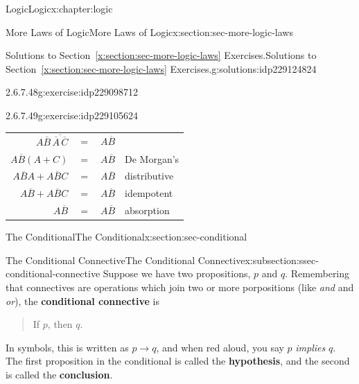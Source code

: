 \documentclass[twoside,10pt,]{book}
\newcommand{\tabularfont}{\relax}
\newcommand{\xreffont}{\relax}
\newcommand{\terminology}[1]{\textbf{#1}}
\numberwithin{equation}{section}
\newcommand{\conditional}{{p {\rightarrow} q}}
\begin{document}
\begin{chapterptx}{Logic}{}{Logic}{}{}{x:chapter:logic}
\begin{sectionptx}{More Laws of Logic}{}{More Laws of Logic}{}{}{x:section:sec-more-logic-laws}
\begin{solutions-subsection}{Solutions to Section~{\xreffont\ref*{x:section:sec-more-logic-laws}} Exercises.}{}{Solutions to Section~{\xreffont\ref*{x:section:sec-more-logic-laws}} Exercises.}{}{}{g:solutions:idp229124824}
\begin{exercisegroup}
\begin{divisionsolutioneg}{2.6.7.48}{}{g:exercise:idp229098712}
\begin{center}
{}%
\end{center}%
\end{divisionsolutioneg}%
\begin{divisionsolutioneg}{2.6.7.49}{}{g:exercise:idp229105624}%
\par\smallskip%
\noindent\hypertarget{g:solution:idp229107928-main}{}\begin{center}%
{\tabularfont%
\begin{tabular}{llll}
\multicolumn{1}{r}{\(A\overline{B}{}\,\overline{\overline{A}{}\,\overline{C}{}}\)}&\(=\)&\(A\overline{B}{}\)&\tabularnewline[0pt]
\multicolumn{1}{r}{\(A\overline{B}{}(A+C)\)}&\(=\)&\(A\overline{B}{}\)&De Morgan's\tabularnewline[0pt]
\multicolumn{1}{r}{\(A\overline{B}{}A+A\overline{B}{}C\)}&\(=\)&\(A\overline{B}{}\)&distributive\tabularnewline[0pt]
\multicolumn{1}{r}{\(A\overline{B}{}+A\overline{B}{}C\)}&\(=\)&\(A\overline{B}{}\)&idempotent\tabularnewline[0pt]
\multicolumn{1}{r}{\(A\overline{B}{}\)}&\(=\)&\(A\overline{B}{}\)&absorption
\end{tabular}
}%
\end{center}%
\end{divisionsolutioneg}%
\end{exercisegroup}
\par\medskip\noindent
\end{solutions-subsection}
\end{sectionptx}
%
%
\typeout{************************************************}
\typeout{************************************************}
%
\begin{sectionptx}{The Conditional}{}{The Conditional}{}{}{x:section:sec-conditional}
%
%
\typeout{************************************************}
\typeout{************************************************}
%
\begin{subsectionptx}{The Conditional Connective}{}{The Conditional Connective}{}{}{x:subsection:ssec-conditional-connective}
Suppose we have two propositions, \(p\) and \(q\).  Remembering that connectives are operations which join two or more porpositions (like \emph{and} and \emph{or}), the \terminology{conditional connective} is \begin{quote}%
If \(p\), then \(q\).\end{quote}
%
\par
In symbols, this is written as \(\conditional\), and when red aloud, you say \(p\) \emph{implies} \(q\).  The first proposition in the conditional is called the \terminology{hypothesis}, and the second is called the \terminology{conclusion}.%

\end{subsectionptx}
\end{sectionptx}
\end{chapterptx}
\end{document}
